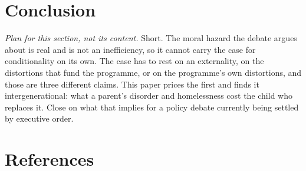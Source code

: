 \documentclass[10pt]{article}
\begin{document}
\section{Conclusion}\label{sec:conclusion}

\emph{Plan for this section, not its content.} Short. The moral hazard
the debate argues about is real and is not an inefficiency, so it cannot carry the
case for conditionality on its own. The case has to rest on an externality, on the
distortions that fund the programme, or on the programme's own distortions, and those
are three different claims. This paper prices the first and finds it
intergenerational: what a parent's disorder and homelessness cost the child who
replaces it. Close on what that implies for a policy debate currently being settled by
executive order.


\section*{References}
\end{document}
